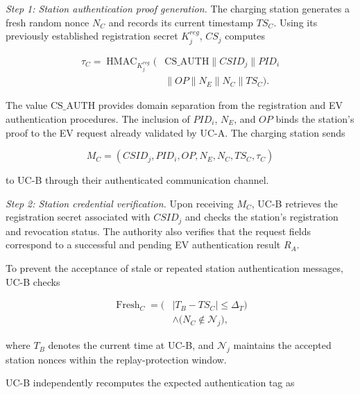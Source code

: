 \documentclass[twocolumn,10pt,journal]{IEEEtran}
\begin{document}
\textit{Step 1: Station authentication proof generation.}
The charging station generates a fresh random nonce
$N_C$ and records its current timestamp $TS_C$.
Using its previously established registration
secret $K_j^{reg}$, $CS_j$ computes

\begin{equation}
\begin{aligned}
\tau_C =
\operatorname{HMAC}_{K_j^{reg}}\big(
&\mathrm{CS\_AUTH}\parallel CSID_j
\parallel PID_i\\
&\parallel OP\parallel N_E
\parallel N_C\parallel TS_C
\big).
\end{aligned}
\label{eq:cs_auth_proof}
\end{equation}

The value $\mathrm{CS\_AUTH}$ provides domain
separation from the registration and EV
authentication procedures. The inclusion of
$PID_i$, $N_E$, and $OP$ binds the station's
proof to the EV request already validated by
UC-A. The charging station sends

\begin{equation}
M_C =
(CSID_j,PID_i,OP,N_E,N_C,TS_C,\tau_C)
\label{eq:cs_auth_message}
\end{equation}

to UC-B through their authenticated
communication channel.

\textit{Step 2: Station credential verification.}
Upon receiving $M_C$, UC-B retrieves the
registration secret associated with $CSID_j$
and checks the station's registration and
revocation status. The authority also verifies
that the request fields correspond to a
successful and pending EV authentication
result $R_A$.

To prevent the acceptance of stale or repeated
station authentication messages, UC-B checks

\begin{equation}
\begin{aligned}
\operatorname{Fresh}_{C}
=
\bigl(&|T_B-TS_C|\leq\Delta_T\bigr)
\\
&\land
\bigl(N_C\notin\mathcal{N}_j\bigr),
\end{aligned}
\label{eq:cs_auth_freshness}
\end{equation}

where $T_B$ denotes the current time at UC-B,
and $\mathcal{N}_j$ maintains the accepted
station nonces within the replay-protection
window.

UC-B independently recomputes the expected
authentication tag as
\end{document}
